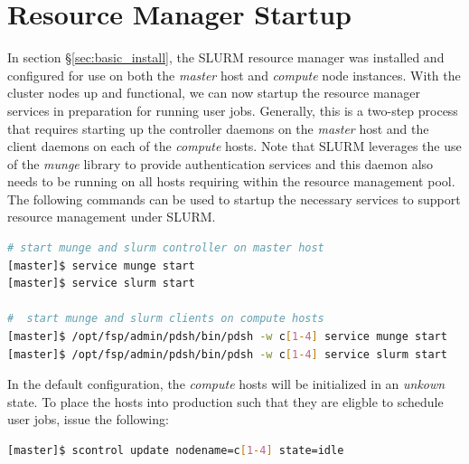 \documentclass[letterpaper]{article}
\begin{document}
{\section{Resource Manager Startup}

In section \S\ref{sec:basic_install}, the SLURM resource manager was installed
and configured for use on both the {\em master} host and {\em compute} node
instances. With the cluster nodes up and functional, we can now startup the
resource manager services in preparation for running user jobs. Generally, this
is a two-step process that requires starting up the controller daemons on the {\em
  master} host and the client daemons on each of the {\em compute} hosts.  
Note that SLURM leverages the use of the {\em munge} library to provide
authentication services and this daemon also needs to be running on all hosts
requiring within the resource management pool. 
The following commands can be used to startup the necessary services to support
resource management under SLURM.

\begin{lstlisting}[language=bash]
# start munge and slurm controller on master host
[master]$ service munge start
[master]$ service slurm start

#  start munge and slurm clients on compute hosts
[master]$ /opt/fsp/admin/pdsh/bin/pdsh -w c[1-4] service munge start
[master]$ /opt/fsp/admin/pdsh/bin/pdsh -w c[1-4] service slurm start
\end{lstlisting}

In the default configuration, the {\em compute} hosts will be initialized in an
{\em unkown} state. To place the hosts into production such that they are
eligble to schedule user jobs, issue the following:


\begin{lstlisting}[language=bash]
[master]$ scontrol update nodename=c[1-4] state=idle
\end{lstlisting}


}
\end{document}
